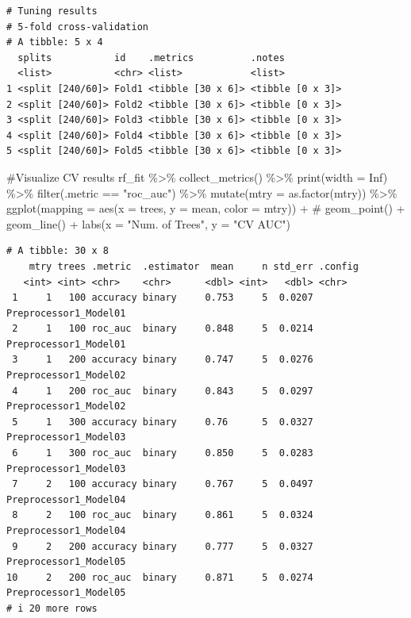 \documentclass[
]{article}
\newenvironment{Shaded}{\begin{snugshade}}{\end{snugshade}}
\newcommand{\AttributeTok}[1]{\textcolor[rgb]{0.40,0.45,0.13}{#1}}
\newcommand{\CommentTok}[1]{\textcolor[rgb]{0.37,0.37,0.37}{#1}}
\newcommand{\ConstantTok}[1]{\textcolor[rgb]{0.56,0.35,0.01}{#1}}
\newcommand{\FunctionTok}[1]{\textcolor[rgb]{0.28,0.35,0.67}{#1}}
\newcommand{\NormalTok}[1]{\textcolor[rgb]{0.00,0.23,0.31}{#1}}
\newcommand{\SpecialCharTok}[1]{\textcolor[rgb]{0.37,0.37,0.37}{#1}}
\newcommand{\StringTok}[1]{\textcolor[rgb]{0.13,0.47,0.30}{#1}}
\begin{document}
\begin{verbatim}
# Tuning results
# 5-fold cross-validation 
# A tibble: 5 x 4
  splits           id    .metrics          .notes          
  <list>           <chr> <list>            <list>          
1 <split [240/60]> Fold1 <tibble [30 x 6]> <tibble [0 x 3]>
2 <split [240/60]> Fold2 <tibble [30 x 6]> <tibble [0 x 3]>
3 <split [240/60]> Fold3 <tibble [30 x 6]> <tibble [0 x 3]>
4 <split [240/60]> Fold4 <tibble [30 x 6]> <tibble [0 x 3]>
5 <split [240/60]> Fold5 <tibble [30 x 6]> <tibble [0 x 3]>
\end{verbatim}

\begin{Shaded}
\begin{Highlighting}[]
\CommentTok{\#Visualize CV results}
\NormalTok{rf\_fit }\SpecialCharTok{\%\textgreater{}\%}
  \FunctionTok{collect\_metrics}\NormalTok{() }\SpecialCharTok{\%\textgreater{}\%}
  \FunctionTok{print}\NormalTok{(}\AttributeTok{width =} \ConstantTok{Inf}\NormalTok{) }\SpecialCharTok{\%\textgreater{}\%}
  \FunctionTok{filter}\NormalTok{(.metric }\SpecialCharTok{==} \StringTok{"roc\_auc"}\NormalTok{) }\SpecialCharTok{\%\textgreater{}\%}
  \FunctionTok{mutate}\NormalTok{(}\AttributeTok{mtry =} \FunctionTok{as.factor}\NormalTok{(mtry)) }\SpecialCharTok{\%\textgreater{}\%}
  \FunctionTok{ggplot}\NormalTok{(}\AttributeTok{mapping =} \FunctionTok{aes}\NormalTok{(}\AttributeTok{x =}\NormalTok{ trees, }\AttributeTok{y =}\NormalTok{ mean, }\AttributeTok{color =}\NormalTok{ mtry)) }\SpecialCharTok{+}
  \CommentTok{\# geom\_point() + }
  \FunctionTok{geom\_line}\NormalTok{() }\SpecialCharTok{+} 
  \FunctionTok{labs}\NormalTok{(}\AttributeTok{x =} \StringTok{"Num. of Trees"}\NormalTok{, }\AttributeTok{y =} \StringTok{"CV AUC"}\NormalTok{)}
\end{Highlighting}
\end{Shaded}

\begin{verbatim}
# A tibble: 30 x 8
    mtry trees .metric  .estimator  mean     n std_err .config              
   <int> <int> <chr>    <chr>      <dbl> <int>   <dbl> <chr>                
 1     1   100 accuracy binary     0.753     5  0.0207 Preprocessor1_Model01
 2     1   100 roc_auc  binary     0.848     5  0.0214 Preprocessor1_Model01
 3     1   200 accuracy binary     0.747     5  0.0276 Preprocessor1_Model02
 4     1   200 roc_auc  binary     0.843     5  0.0297 Preprocessor1_Model02
 5     1   300 accuracy binary     0.76      5  0.0327 Preprocessor1_Model03
 6     1   300 roc_auc  binary     0.850     5  0.0283 Preprocessor1_Model03
 7     2   100 accuracy binary     0.767     5  0.0497 Preprocessor1_Model04
 8     2   100 roc_auc  binary     0.861     5  0.0324 Preprocessor1_Model04
 9     2   200 accuracy binary     0.777     5  0.0327 Preprocessor1_Model05
10     2   200 roc_auc  binary     0.871     5  0.0274 Preprocessor1_Model05
# i 20 more rows
\end{verbatim}
\end{document}
